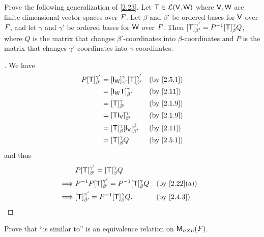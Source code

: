 \exercisesection

\setcounter{ex}{7}
\begin{ex}\label{ex:2.5.8}
  Prove the following generalization of \cref{2.23}.
  Let \(\mathsf{T} \in \mathcal{L}(\mathsf{V}, \mathsf{W})\) where \(\mathsf{V}, \mathsf{W}\) are finite-dimensional vector spaces over \(\mathit{F}\).
  Let \(\beta\) and \(\beta'\) be ordered bases for \(\mathsf{V}\) over \(\mathit{F}\), and let \(\gamma\) and \(\gamma'\) be ordered bases for \(\mathsf{W}\) over \(\mathit{F}\).
  Then \([\mathsf{T}]_{\beta'}^{\gamma'} = P^{-1} [\mathsf{T}]_{\beta}^{\gamma} Q\), where \(Q\) is the matrix that changes \(\beta'\)-coordinates into \(\beta\)-coordinates and \(P\) is the matrix that changes \(\gamma'\)-coordinates into \(\gamma\)-coordinates.
\end{ex}

\begin{proof}[]
  We have
  \begin{align*}
    P [\T]_{\beta'}^{\gamma'} & = [\IT[\W]]_{\gamma'}^{\gamma} [\T]_{\beta'}^{\gamma'} &  & \by{2.5.1} \\
                              & = [\IT[\W] \T]_{\beta'}^{\gamma}                       &  & \by{2.11}  \\
                              & = [\T]_{\beta'}^{\gamma}                               &  & \by{2.1.9} \\
                              & = [\T \IT[\V]]_{\beta'}^{\gamma}                       &  & \by{2.1.9} \\
                              & = [\T]_{\beta}^{\gamma} [\IT[\V]]_{\beta'}^{\beta}     &  & \by{2.11}  \\
                              & = [\T]_{\beta}^{\gamma} Q                              &  & \by{2.5.1}
  \end{align*}
  and thus
  \begin{align*}
             & P [\T]_{\beta'}^{\gamma'} = [\T]_{\beta}^{\gamma} Q                                 \\
    \implies & P^{-1} P [\T]_{\beta'}^{\gamma'} = P^{-1} [\T]_{\beta}^{\gamma} Q &  & \by{2.22}[a] \\
    \implies & [\T]_{\beta'}^{\gamma'} = P^{-1} [\T]_{\beta}^{\gamma} Q.         &  & \by{2.4.3}
  \end{align*}
\end{proof}

\begin{ex}\label{ex:2.5.9}
  Prove that ``is similar to'' is an equivalence relation on \(\ms[n][n][\F]\).
\end{ex}

